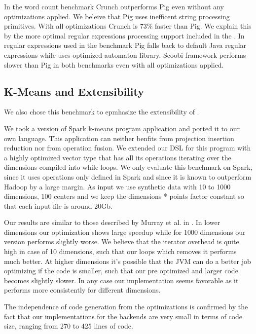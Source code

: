 In the word count benchmark Crunch outperforms Pig even without any optimizations applied. We beleive that Pig uses inefficent string processing primitives. With all optimizations Crunch is 73\% faster than Pig. We explain this by the more optimal regular expressions processing support included in the \tool. In regular expressions used in the benchmark Pig falls back to default Java regular expressions while \tool uses optimized automaton library. Scoobi framework performs slower than Pig in both benchmarks even with all optimizations applied.


\subsection{K-Means and Extensibility}
\label{subsec:kmeans}

We also chose this benchmark to epmhasize the extensibility of \tool.

We took a version of Spark k-means program  application and ported it to our own language. This application can neither benfits from projection insertion reduction nor from operation fusion. We extended our DSL for this program with a highly optimized vector type that has all its operations iterating over the dimensions compiled into while loops. We only evaluate this benchmark on Spark, since it uses operations only defined in Spark and since it is known to outperform Hadoop by a large margin. As input we use synthetic data with 10 to 1000 dimensions, 100 centers and we keep the dimensions * points factor constant so that each input file is around 20Gb.

Our results are similar to those described by Murray et al. in \cite{murray_steno:_2011}. In lower dimensions our optimization shows large speedup while for 1000 dimensions our version performs slightly worse. We believe that the iterator overhead is quite high in case of 10 dimensions, such that our loops which removes it performs much better. At higher dimensions it's possible that the JVM can do a better job optimizing if the code is smaller, such that our pre optimized and larger code becomes slightly slower. In any case our implementation seems favorable as it performs more consistently for different dimensions.

The independence of code generation from the optimizations is confirmed by the fact that our implementations for the backends are very small in terms of code size, ranging from 270 to 425 lines of code.